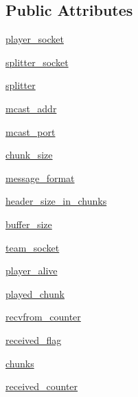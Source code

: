 \subsection*{Public Attributes}
\begin{DoxyCompactItemize}
\item 
\hyperlink{classsrc_1_1core_1_1peer__ims_1_1Peer__IMS_af0cec94f2c4e2d2a8e99c748fb9fa5b5}{player\+\_\+socket}
\item 
\hyperlink{classsrc_1_1core_1_1peer__ims_1_1Peer__IMS_a2b943b00f57f4bb49e0f41dfbf6a0cda}{splitter\+\_\+socket}
\item 
\hyperlink{classsrc_1_1core_1_1peer__ims_1_1Peer__IMS_ad7cecf51b6f701abb603443b2f9e36b1}{splitter}
\item 
\hyperlink{classsrc_1_1core_1_1peer__ims_1_1Peer__IMS_a92b3ec069f40b71ae5ca3d394e17601c}{mcast\+\_\+addr}
\item 
\hyperlink{classsrc_1_1core_1_1peer__ims_1_1Peer__IMS_a1ce7993dc45129cfac9bfad943b66b50}{mcast\+\_\+port}
\item 
\hyperlink{classsrc_1_1core_1_1peer__ims_1_1Peer__IMS_a5f010bb5b156212027865fedc8628905}{chunk\+\_\+size}
\item 
\hyperlink{classsrc_1_1core_1_1peer__ims_1_1Peer__IMS_af146f20975eb7b1b089c0746210fbf4f}{message\+\_\+format}
\item 
\hyperlink{classsrc_1_1core_1_1peer__ims_1_1Peer__IMS_a066851fd6c8bf052bff059f91231a32e}{header\+\_\+size\+\_\+in\+\_\+chunks}
\item 
\hyperlink{classsrc_1_1core_1_1peer__ims_1_1Peer__IMS_a1a05d80c5b6b7337394fe3cd747027a9}{buffer\+\_\+size}
\item 
\hyperlink{classsrc_1_1core_1_1peer__ims_1_1Peer__IMS_a8168fae98550467966429b742e9fda58}{team\+\_\+socket}
\item 
\hyperlink{classsrc_1_1core_1_1peer__ims_1_1Peer__IMS_acebb1381bd1a801a8f2bf99f9757ee59}{player\+\_\+alive}
\item 
\hyperlink{classsrc_1_1core_1_1peer__ims_1_1Peer__IMS_ab226eb6bed3d6d26a36ec331ae6ea7e7}{played\+\_\+chunk}
\item 
\hyperlink{classsrc_1_1core_1_1peer__ims_1_1Peer__IMS_a8e39550d083eead799143f49ae2d083c}{recvfrom\+\_\+counter}
\item 
\hyperlink{classsrc_1_1core_1_1peer__ims_1_1Peer__IMS_a8fea5fe4e14a4ab2afb3673a04faffa5}{received\+\_\+flag}
\item 
\hyperlink{classsrc_1_1core_1_1peer__ims_1_1Peer__IMS_adf33b563fd6d50f0d86bbd87797405ce}{chunks}
\item 
\hyperlink{classsrc_1_1core_1_1peer__ims_1_1Peer__IMS_a44374641cdc36487318e7ab38e052892}{received\+\_\+counter}
\end{DoxyCompactItemize}
